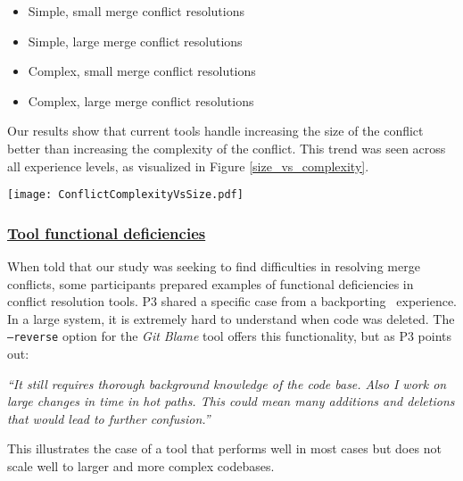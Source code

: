 \begin{itemize}
	\item Simple, small merge conflict resolutions
	\item Simple, large merge conflict resolutions 
	\item Complex, small merge conflict resolutions
	\item Complex, large merge conflict resolutions
\end{itemize}

Our results show that current tools handle increasing the size of the conflict better than increasing the complexity of the conflict. This trend was seen across all experience levels, as visualized in Figure \ref{size_vs_complexity}.

\begin{figure*}[!t]
\centering
\texttt{[image: ConflictComplexityVsSize.pdf]}
\caption{Effectiveness of developer tools in supporting varying levels of size and complexity (by developer experience). Values are number of responses per answer, and bubble size indicates the number of responses for comparison purposes.}
\label{size_vs_complexity}
\end{figure*}

\subsubsection{\underline{Tool functional deficiencies}}
When told that our study was seeking to find difficulties in resolving merge conflicts, some participants prepared examples of functional deficiencies in conflict resolution tools. P3 shared a specific case from a backporting~\cite{gutzmann2009backporting} experience. In a large system, it is extremely hard to understand when code was deleted. The \texttt{--reverse} option for the \textit{Git Blame} tool offers this functionality, but as P3 points out:  

\begin{displayquote}
\textit{``It still requires thorough background knowledge of the code base. Also I work on large changes in time in hot paths. This could mean many additions and deletions that would lead to further confusion.''}
\end{displayquote}

 This illustrates the case of a tool that performs well in most cases but does not scale well to larger and more complex codebases.
 
